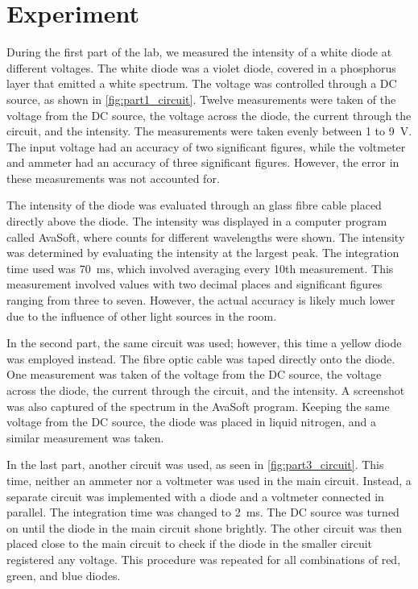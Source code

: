 \section{Experiment}
During the first part of the lab, we measured the intensity of a white diode at different voltages. The white diode was a violet diode, covered in a phosphorus layer that emitted a white spectrum. The voltage was controlled through a DC source, as shown in \autoref{fig:part1_circuit}. Twelve measurements were taken of the voltage from the DC source, the voltage across the diode, the current through the circuit, and the intensity. The measurements were taken evenly between 1 to \SI{9}{\volt}. The input voltage had an accuracy of two significant figures, while the voltmeter and ammeter had an accuracy of three significant figures. However, the error in these measurements was not accounted for. 

The intensity of the diode was evaluated through an glass fibre cable placed directly above the diode. The intensity was displayed in a computer program called AvaSoft, where counts for different wavelengths were shown. The intensity was determined by evaluating the intensity at the largest peak. The integration time used was \SI{70}{\milli\s}, which involved averaging every 10th measurement. This measurement involved values with two decimal places and significant figures ranging from three to seven. However, the actual accuracy is likely much lower due to the influence of other light sources in the room.

In the second part, the same circuit was used; however, this time a yellow diode was employed instead. The fibre optic cable was taped directly onto the diode. One measurement was taken of the voltage from the DC source, the voltage across the diode, the current through the circuit, and the intensity. A screenshot was also captured of the spectrum in the AvaSoft program. Keeping the same voltage from the DC source, the diode was placed in liquid nitrogen, and a similar measurement was taken.

In the last part, another circuit was used, as seen in \autoref{fig:part3_circuit}. This time, neither an ammeter nor a voltmeter was used in the main circuit. Instead, a separate circuit was implemented with a diode and a voltmeter connected in parallel. The integration time was changed to \SI{2}{\milli\s}. The DC source was turned on until the diode in the main circuit shone brightly. The other circuit was then placed close to the main circuit to check if the diode in the smaller circuit registered any voltage. This procedure was repeated for all combinations of red, green, and blue diodes.



